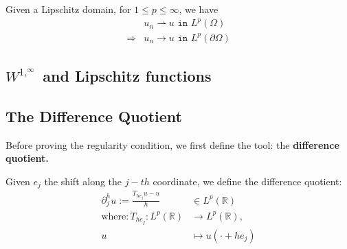 \begin{theorem}
	Given a Lipschitz domain, for $1 \le p \le \infty$, we have
	\begin{align*}
		&u_n \rightharpoonup u \texttt{ in } L^p(\Omega)\\
		\Rightarrow &u_n \rightarrow u \texttt{ in } L^p(\partial\Omega)
	\end{align*}
\end{theorem}


\subsection{ $W^{1, ^\infty}$ and Lipschitz functions}



\subsection{The Difference Quotient}
Before proving the regularity condition, we first define the tool: the \textbf{difference quotient.}

\begin{definition}
	Given $e_j$ the shift along the $j-th$ coordinate, we define the difference quotient:
	\begin{align*}
		\partial^h_j u := \frac{T_{he_j} u - u}{h} &\in L^p(\mathbb{R})\\
		\text{where}: T_{he_j}: L^p(\mathbb{R}) &\rightarrow L^p(\mathbb{R}), \\
		u &\mapsto u(\cdot + he_j)
	\end{align*}
\end{definition}

